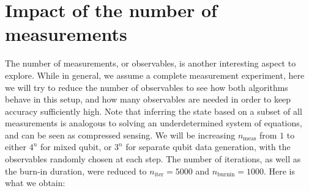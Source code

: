 \documentclass[12pt]{memoir}
\newcommand{\nitern}[1]{$n_{\text{iter}}=#1$}
\newcommand{\nburninn}[1]{$n_{\text{burnin}}=#1$}
\newcommand{\nmeas}[0]{$n_{\text{meas}} $ }
\begin{document}
\section{Impact of the number of measurements}\label{section:comp-nb-meas}

The number of measurements, or observables, is another interesting aspect to explore. While in general, we assume a complete measurement experiment, here we will try to reduce the number of observables to see how both algorithms behave in this setup, and how many observables are needed in order to keep accuracy sufficiently high. Note that inferring the state based on a subset of all measurements is analogous to solving an underdetermined system of equations, and can be seen as compressed sensing. We will be increasing \nmeas from $1$ to either $4^n$ for mixed qubit, or $3^n$ for separate qubit data generation, with the observables randomly chosen at each step. The number of iterations, as well as the burn-in duration, were reduced to \nitern{5000} and \nburninn{1000}. Here is what we obtain:
\end{document}
